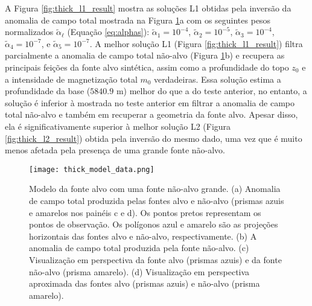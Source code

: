 A Figura \ref{fig:thick_l1_result} mostra as soluções L1 obtidas pela inversão da anomalia de campo total mostrada na Figura \ref{fig:thick_model}a
com os seguintes pesos normalizados $\tilde{\alpha}_{\ell}$ (Equação \ref{eq:alphas}):
$\tilde{\alpha}_{1} = 10^{-4}$, $\tilde{\alpha}_{2} = 10^{-5}$, 
$\tilde{\alpha}_{3} = 10^{-4}$, $\tilde{\alpha}_{4} = 10^{-7}$, e 
$\tilde{\alpha}_{5} = 10^{-7}$.
A melhor solução L1 (Figura \ref{fig:thick_l1_result}) filtra parcialmente a anomalia de campo total não-alvo (Figura \ref{fig:thick_model}b) e recupera as principais feições da fonte alvo sintética, assim como a profundidade do topo $z_{0}$ e a intensidade de magnetização total $m_{0}$ verdadeiras.
Essa solução estima a profundidade da base ($5840.9$ m) melhor do que a do teste anterior, no entanto, a solução é inferior à mostrada no teste anterior em filtrar a anomalia de campo total não-alvo e também em recuperar a geometria da fonte alvo.
Apesar disso, ela é significativamente superior à melhor solução L2 (Figura \ref{fig:thick_l2_result}) obtida pela inversão do mesmo dado, uma vez que é muito menos afetada pela presença de uma grande fonte não-alvo.
\pagebreak
\begin{figure}[!htb]
	\centering
	\texttt{[image: thick\_model\_data.png]}
	\caption{Modelo da fonte alvo com uma fonte não-alvo grande.
		(a) Anomalia de campo total produzida pelas fontes alvo e não-alvo
		(prismas azuis e amarelos nos painéis c e d). Os pontos pretos representam os pontos de observação. Os polígonos azul e amarelo são as projeções horizontais das fontes alvo e não-alvo, respectivamente.
		(b) A anomalia de campo total produzida pela fonte não-alvo. 
		(c) Visualização em perspectiva da fonte alvo (prismas azuis) e da fonte não-alvo (prisma amarelo). 
		(d) Visualização em perspectiva aproximada das fontes alvo (prismas azuis) e não-alvo (prisma amarelo).
	}
	\label{fig:thick_model}
\end{figure}
\pagebreak

